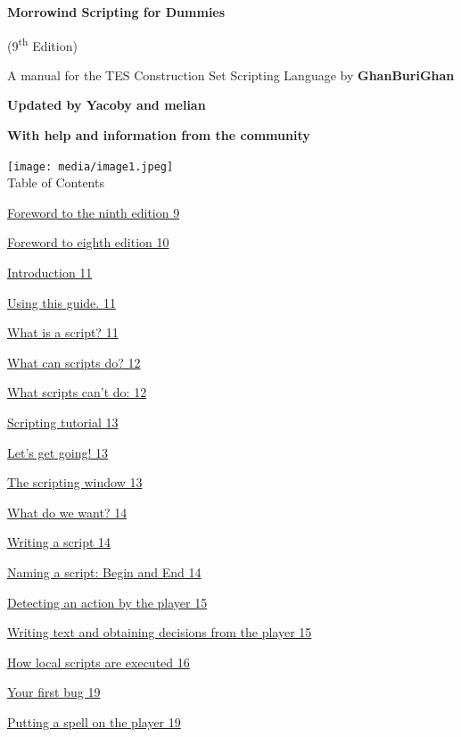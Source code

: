 \documentclass[
]{article}
\author{}
\date{}
\begin{document}
\textbf{Morrowind Scripting for Dummies}

(9\textsuperscript{th} Edition)

A manual for the TES Construction Set Scripting Language by
\textbf{GhanBuriGhan}

\textbf{Updated by Yacoby and melian}

\textbf{With help and information from the community}

\texttt{[image: media/image1.jpeg]}\\
Table of Contents

\protect\hyperlink{foreword-to-the-ninth-edition}{Foreword to the ninth
edition 9}

\protect\hyperlink{foreword-to-eighth-edition}{Foreword to eighth
edition 10}

\protect\hyperlink{_Toc53412549}{Introduction 11}

\protect\hyperlink{using-this-guide.}{Using this guide. 11}

\protect\hyperlink{what-is-a-script}{What is a script? 11}

\protect\hyperlink{what-can-scripts-do}{What can scripts do? 12}

\protect\hyperlink{what-scripts-cant-do}{What scripts can't do: 12}

\protect\hyperlink{_Toc53412554}{Scripting tutorial 13}

\protect\hyperlink{lets-get-going}{Let's get going! 13}

\protect\hyperlink{the-scripting-window}{The scripting window 13}

\protect\hyperlink{what-do-we-want}{What do we want? 14}

\protect\hyperlink{writing-a-script}{Writing a script 14}

\protect\hyperlink{naming-a-script-begin-and-end}{Naming a script: Begin
and End 14}

\protect\hyperlink{detecting-an-action-by-the-player}{Detecting an
action by the player 15}

\protect\hyperlink{writing-text-and-obtaining-decisions-from-the-player}{Writing
text and obtaining decisions from the player 15}

\protect\hyperlink{how-local-scripts-are-executed}{How local scripts are
executed 16}

\protect\hyperlink{your-first-bug}{Your first bug 19}

\protect\hyperlink{putting-a-spell-on-the-player}{Putting a spell on the
player 19}
\end{document}
